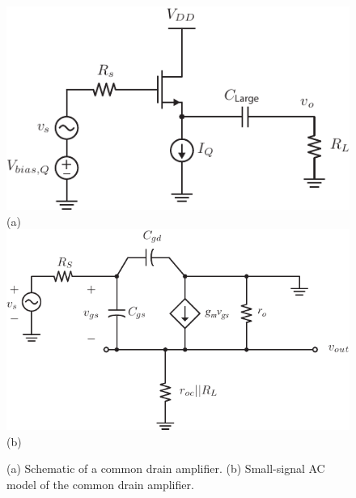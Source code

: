 \begin{figure}[H]
\centering
\includegraphics[scale=1.45]{cd_amp_load}\\
(a)\\[1.0cm]
\includegraphics[scale=1.45]{cd_amp_ss_cap}\\
(b)\\
\caption{(a) Schematic of a common drain amplifier.  (b) Small-signal AC model of the common drain amplifier.}
\label{fig:cd_amp_load}
\end{figure}
\newpage
